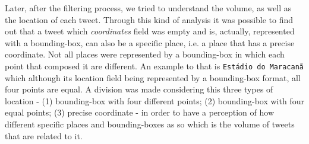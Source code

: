 Later, after the filtering process, we tried to understand the volume, as well as the location of each tweet. Through this kind of analysis it was possible to find out that a tweet which \textit{coordinates }field was empty and is, actually, represented with a bounding-box, can also be a specific place, i.e. a place that has a precise coordinate. Not all places were represented by a bounding-box in which each point that composed it are different. An example to that is \texttt{Estádio do Maracanã} which although its location field being represented by a bounding-box format, all four points are equal. A division was made considering this three types of location - (1) bounding-box with four different points; (2) bounding-box with four equal points; (3) precise coordinate - in order to have a perception of how different specific places and bounding-boxes as so which is the volume of tweets that are related to it.

\begin{table}[htbp]
	\centering
	\caption{Volume of tweets for each type of geo-location}
	\label{tab:volume_geolocation}
	\end{table}


